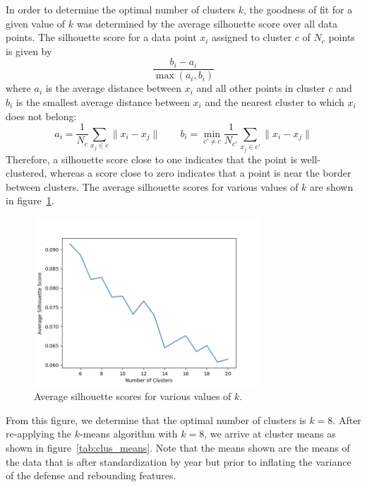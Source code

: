 In order to determine the optimal number of clusters $k$, the goodness of fit for
a given value of $k$ was determined by the average silhouette score over all data
points. The silhouette score for a data point $x_i$ assigned to cluster $c$ of $N_c$
points is given by
$$
\frac{b_i - a_i}{\max(a_i, b_i)}
$$
where $a_i$ is the average distance between $x_i$ and all other points in cluster
$c$ and $b_i$ is the smallest average distance between $x_i$ and the nearest cluster
to which $x_i$ does not belong:
$$
a_i = \frac{1}{N_c} \sum_{x_j \in c} \lVert x_i - x_j \rVert \qquad
b_i = \min_{c' \neq c} \frac{1}{N_{c'}} \sum_{x_j \in c'} \lVert x_i - x_j
\rVert
$$
Therefore, a silhouette score close to one indicates that the point is
well-clustered, whereas a score close to zero indicates that a point is near the
border between clusters. The average silhouette scores for various values of $k$ are
shown in figure~\ref{fig:sils}.

\begin{figure}
    \centering
    \includegraphics[width=0.75\textwidth]{figures/sil_scores}
    \caption{Average silhouette scores for various values of $k$.}
    \label{fig:sils}
\end{figure}

From this figure, we determine that the optimal number of clusters is $k=8$.  After
re-applying the $k$-means algorithm with $k=8$, we arrive at cluster means as shown
in figure~\ref{tab:clus_means}. Note that the means shown are the means of the data
that is after standardization by year but prior to inflating the variance of the
defense and rebounding features.

\begin{table}
    \centering
    \noindent{}
    \caption{TODO}
    \label{tab:clus_means}
\end{table}

